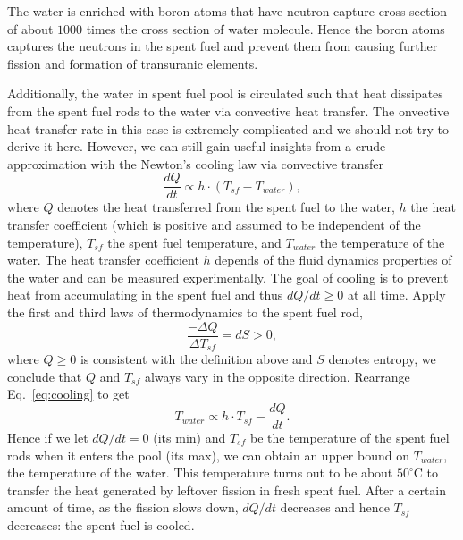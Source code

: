 \documentclass[nofootinbib,preprint,aps]{revtex4-1}
\begin{document}
    The water is enriched with boron atoms that have neutron capture cross section of about $1000$ times
    the cross section of water molecule. Hence the boron atoms captures the neutrons in the spent fuel
    and prevent them from causing further fission and formation of transuranic elements.

    Additionally, the water in spent fuel pool is circulated such that heat dissipates from the spent
    fuel rods to the water via convective heat transfer. The onvective heat transfer rate in this case is
    extremely complicated and we should not try to derive it here. However, we can still gain useful insights
    from a crude approximation with the Newton's cooling law via convective transfer
    \begin{equation}
        \label{eq:cooling}
        \frac{dQ}{dt} \propto h\cdot (T_{sf} - T_{water}),
    \end{equation}
    where $Q$ denotes the heat transferred from the spent fuel to the water,
    $h$ the heat transfer coefficient (which is positive and assumed to be independent
    of the temperature), $T_{sf}$ the spent fuel temperature, and $T_{water}$ the temperature
    of the water.
    The heat transfer coefficient $h$ depends of the fluid dynamics properties of the water and can
    be measured experimentally. The goal of
    cooling is to prevent heat from accumulating in the spent fuel and thus $dQ/dt \geq 0$ at all time.
    Apply the first and third laws of thermodynamics to the spent fuel rod,
    \begin{equation}
        \label{eq:first}
        \frac{-\Delta Q}{\Delta T_{sf}} = dS > 0,
    \end{equation}
    where $Q\geq 0$ is consistent with the definition above and $S$ denotes entropy, we conclude that $Q$ and $T_{sf}$ always vary in the opposite direction. Rearrange Eq.~\ref{eq:cooling} to get
    \begin{equation}
        T_{water} \propto h\cdot T_{sf} - \frac{dQ}{dt}.
    \end{equation}
    Hence if we let $dQ/dt=0$ (its min) and $T_{sf}$ be the temperature of the spent
    fuel rods when it enters the pool (its max), we
    can obtain an upper bound on $T_{water}$, the temperature of the water. This temperature turns out to
    be about $50^{\circ}$C to transfer the heat generated by leftover fission in fresh spent fuel. After a
    certain amount of time, as the fission slows down, $dQ/dt$ decreases and hence $T_{sf}$ decreases: the spent
    fuel is cooled.
\end{document}

